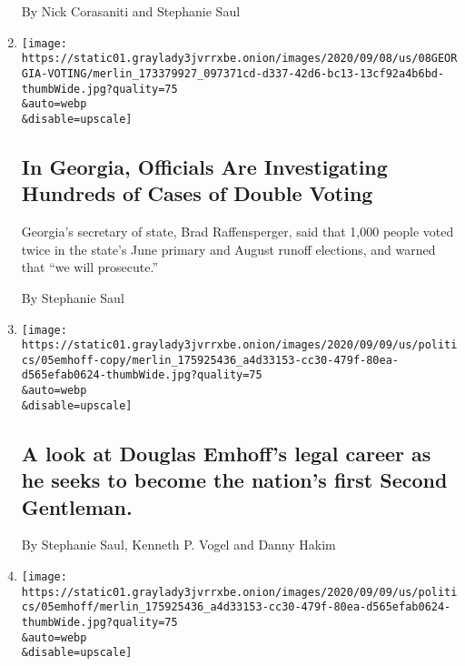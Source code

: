 \begin{enumerate}
  By Nick Corasaniti and Stephanie Saul
\item
  \href{/2020/09/08/us/politics/georgia-double-voting.html}{}

  \texttt{[image: https://static01.graylady3jvrrxbe.onion/images/2020/09/08/us/08GEORGIA-VOTING/merlin\_173379927\_097371cd-d337-42d6-bc13-13cf92a4b6bd-thumbWide.jpg?quality=75\\\&auto=webp\\\&disable=upscale]}

  \hypertarget{in-georgia-officials-are-investigating-hundreds-of-cases-of-double-voting}{%
  \subsection{In Georgia, Officials Are Investigating Hundreds of Cases
  of Double
  Voting}\label{in-georgia-officials-are-investigating-hundreds-of-cases-of-double-voting}}

  Georgia's secretary of state, Brad Raffensperger, said that 1,000
  people voted twice in the state's June primary and August runoff
  elections, and warned that ``we will prosecute.''

  By Stephanie Saul
\item
  \href{/2020/09/08/us/elections/a-look-at-douglas-emhoffs-legal-career-as-he-seeks-to-become-the-nations-first-second-gentleman.html}{}

  \texttt{[image: https://static01.graylady3jvrrxbe.onion/images/2020/09/09/us/politics/05emhoff-copy/merlin\_175925436\_a4d33153-cc30-479f-80ea-d565efab0624-thumbWide.jpg?quality=75\\\&auto=webp\\\&disable=upscale]}

  \hypertarget{a-look-at-douglas-emhoffs-legal-career-as-he-seeks-to-become-the-nations-first-second-gentleman}{%
  \subsection{A look at Douglas Emhoff's legal career as he seeks to
  become the nation's first Second
  Gentleman.}\label{a-look-at-douglas-emhoffs-legal-career-as-he-seeks-to-become-the-nations-first-second-gentleman}}

  By Stephanie Saul, Kenneth P. Vogel and Danny Hakim
\item
  \href{/2020/09/08/us/politics/doug-emhoff-kamala-harris-law.html}{}

  \texttt{[image: https://static01.graylady3jvrrxbe.onion/images/2020/09/09/us/politics/05emhoff/merlin\_175925436\_a4d33153-cc30-479f-80ea-d565efab0624-thumbWide.jpg?quality=75\\\&auto=webp\\\&disable=upscale]}


\end{enumerate}
